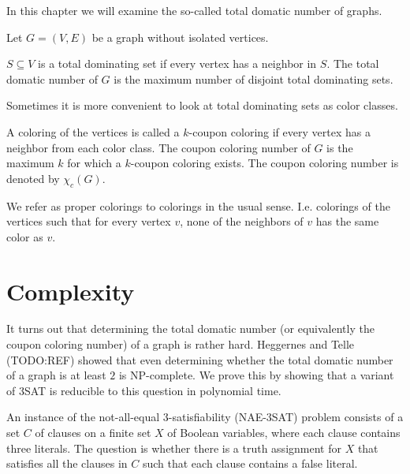 In this chapter we will examine the so-called total domatic number of graphs.

Let $G = (V, E)$ be a graph without isolated vertices.

\begin{definition}
  $S \subseteq V$ is a total dominating set if every vertex has a neighbor in
  $S$. The total domatic number of $G$ is the maximum number of disjoint total
  dominating sets.
\end{definition}

Sometimes it is more convenient to look at total dominating sets as color classes.

\begin{definition}
  A coloring of the vertices is called a $k$-coupon coloring if every vertex
  has a neighbor from each color class. The coupon coloring number of $G$ is
  the maximum $k$ for which a $k$-coupon coloring exists. The coupon coloring
  number is denoted by $\chi_c(G)$.
\end{definition}

\begin{remark}
  We refer as proper colorings to colorings in the usual sense. I.e. colorings of
  the vertices such that for every vertex $v$, none of the neighbors of $v$ has the
  same color as $v$.
\end{remark}

\section{Complexity}

It turns out that determining the total domatic number (or equivalently the
coupon coloring number) of a graph is rather hard. Heggernes and Telle (TODO:REF) showed that
even determining whether the total
domatic number of a graph is at least $2$ is NP-complete. We prove this by showing
that a variant of 3SAT is reducible to this question in polynomial time.

\begin{definition}
  An instance of the not-all-equal 3-satisfiability (NAE-3SAT) problem consists of
  a set $C$ of clauses on a finite set $X$ of Boolean variables, where each clause
  contains three literals. The question is whether there is a truth assignment for
  $X$ that satisfies all the clauses in $C$ such that each clause contains a false
  literal.
\end{definition}

